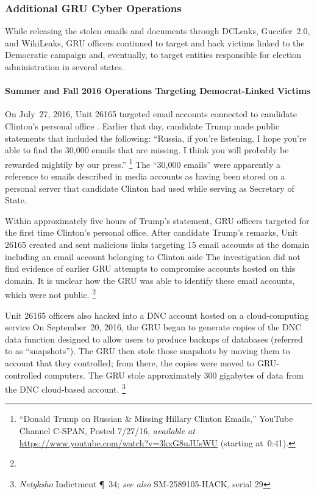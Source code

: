 \subsubsection{Additional GRU Cyber Operations}

While releasing the stolen emails and documents through DCLeaks, Guccifer~2.0, and WikiLeaks, GRU officers continued to target and hack victims linked to the Democratic campaign and, eventually, to target entities responsible for election administration in several states.

\paragraph{Summer and Fall 2016 Operations Targeting Democrat-Linked Victims}

On July~27, 2016, Unit 26165 targeted email accounts connected to candidate Clinton's personal office .
Earlier that day, candidate Trump made public statements that included the following: ``Russia, if you're listening, I hope you're able to find the 30,000 emails that are missing.
I think you will probably be rewarded mightily by our press.''%
\footnote{``Donald Trump on Russian \& Missing Hillary Clinton Emails,'' YouTube Channel C-SPAN, Posted 7/27/16, \textit{available at} \url{https://www.youtube.com/watch?v=3kxG8uJUsWU} (starting at~0:41).}
The ``30,000 emails'' were apparently a reference to emails described in media accounts as having been stored on a personal server that candidate Clinton had used while serving as Secretary of State.

Within approximately five hours of Trump's statement, GRU officers targeted for the first time Clinton's personal office.
After candidate Trump's remarks, Unit 26165 created and sent malicious links targeting 15 email accounts at the domain  including an email account belonging to Clinton aide 
The investigation did not find evidence of earlier GRU attempts to compromise accounts hosted on this domain.
It is unclear how the GRU was able to identify these email accounts, which were not public.%
\footnote{}

Unit 26165 officers also hacked into a DNC account hosted on a cloud-computing service 
On September~20, 2016, the GRU began to generate copies of the DNC data  function designed to allow users to produce backups of databases (referred to  as ``snapshots'').
The GRU then stole those snapshots by moving them to  account that they controlled; from there, the copies were moved to GRU-controlled computers.
The GRU stole approximately 300 gigabytes of data from the DNC cloud-based account.%
\footnote{\textit{Netyksho} Indictment \P~34;
\textit{see also} SM-2589105-HACK, serial 29 }

